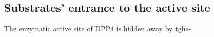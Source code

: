\subsection{Substrates' entrance to the active site}

The enzymatic active site of DPP4 is hidden away by tghe\beta-